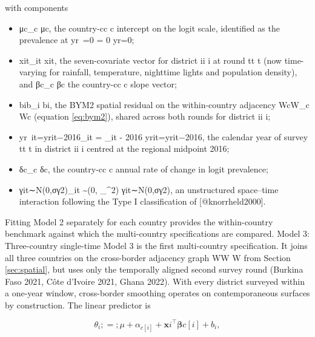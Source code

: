 \documentclass{article}
\begin{document}
with components

\begin{itemize}

\item μc\mu_c
μc​, the country-cc
c intercept on the logit scale, identified as the prevalence at yr~=0 = 0
yr​=0;

\item xit_{it}
xit​, the seven-covariate vector for district ii
i at round tt
t (now time-varying for rainfall, temperature, nighttime lights and population density), and βc\bm{\beta}_c
βc​ the country-cc
c slope vector;

\item bib_i
bi​, the BYM2 spatial residual on the within-country adjacency WcW_c
Wc​ (equation \ref{eq:bym2}), shared across both rounds for district ii
i;

\item yr~it=yrit−2016_{it} = _{it} - 2016
yr​it​=yrit​−2016, the calendar year of survey tt
t in district ii
i centred at the regional midpoint 2016;

\item δc\delta_c
δc​, the country-cc
c annual rate of change in logit prevalence;

\item γit∼N(0,σγ2)\gamma_{it} \sim {}(0, \sigma_\gamma^{2})
γit​∼N(0,σγ2​), an unstructured space–time interaction following the Type I classification of [@knorrheld2000].

\end{itemize}

Fitting Model 2 separately for each country provides the within-country
benchmark against which the multi-country specifications are compared.
Model 3: Three-country single-time \label{sec:m3} Model 3 is the first
multi-country specification. It joins all three countries on the
cross-border adjacency graph WW W from Section \ref{sec:spatial}, but
uses only the temporally aligned second survey round (Burkina Faso 2021,
Côte d'Ivoire 2021, Ghana 2022). With every district surveyed within a
one-year window, cross-border smoothing operates on contemporaneous
surfaces by construction. The linear predictor is

\begin{equation}

\theta_i ;=; \mu + \alpha_{c[i]} + \mathbf{x}i^{\top} \bm{\beta}{c[i]} + b_i,

\label{eq:m3}

\end{equation}
\end{document}
